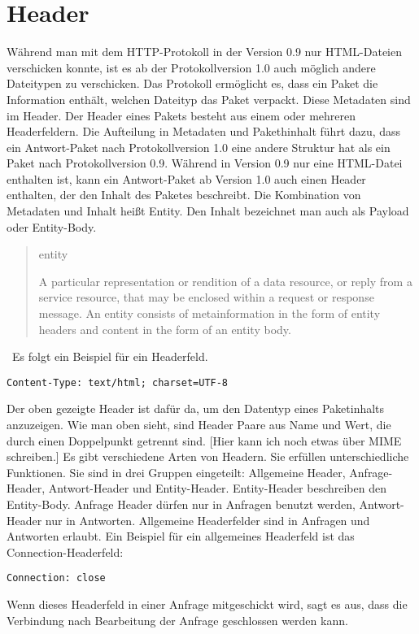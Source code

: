 \documentclass{llncs}
\begin{document}
\section{Header}
Während man mit dem HTTP-Protokoll in der Version 0.9 nur HTML-Dateien verschicken konnte, ist es ab der Protokollversion 1.0 auch möglich andere Dateitypen zu verschicken. Das Protokoll ermöglicht es, dass ein Paket die Information enthält, welchen Dateityp das Paket verpackt. Diese Metadaten sind im Header. Der Header eines Pakets besteht aus einem oder mehreren Headerfeldern. Die Aufteilung in Metadaten und Pakethinhalt führt dazu, dass ein Antwort-Paket nach Protokollversion 1.0 eine andere Struktur hat als ein Paket nach Protokollversion 0.9. Während in Version 0.9 nur eine HTML-Datei enthalten ist, kann ein Antwort-Paket ab Version 1.0 auch einen Header enthalten, der den Inhalt des Paketes beschreibt. Die Kombination von Metadaten und Inhalt heißt Entity. Den Inhalt bezeichnet man auch als Payload oder Entity-Body.
\begin{quote}   entity \linebreak

       A particular representation or rendition of a data resource, or
       reply from a service resource, that may be enclosed within a
       request or response message. An entity consists of
       metainformation in the form of entity headers and content in the
       form of an entity body. \cite{Berners-Lee1996} \end{quote} \
   Es folgt ein Beispiel für ein Headerfeld.
\begin{verbatim}
Content-Type: text/html; charset=UTF-8
\end{verbatim}
Der oben gezeigte Header ist dafür da, um den Datentyp eines Paketinhalts anzuzeigen. Wie man oben sieht, sind Header Paare aus Name und Wert, die durch einen Doppelpunkt getrennt sind. [Hier kann ich noch etwas über MIME schreiben.] \linebreak Es gibt verschiedene Arten von Headern. Sie erfüllen unterschiedliche Funktionen. Sie sind in drei Gruppen eingeteilt: Allgemeine Header, Anfrage-Header, Antwort-Header und Entity-Header. Entity-Header beschreiben den Entity-Body. Anfrage Header dürfen nur in Anfragen benutzt werden, Antwort-Header nur in Antworten.  Allgemeine Headerfelder sind in Anfragen und Antworten erlaubt. Ein Beispiel für ein allgemeines Headerfeld ist das Connection-Headerfeld: 

\begin{verbatim}
Connection: close
\end{verbatim}
Wenn dieses Headerfeld in einer Anfrage mitgeschickt wird, sagt es aus, dass die Verbindung nach Bearbeitung der Anfrage geschlossen werden kann. 
\end{document}

